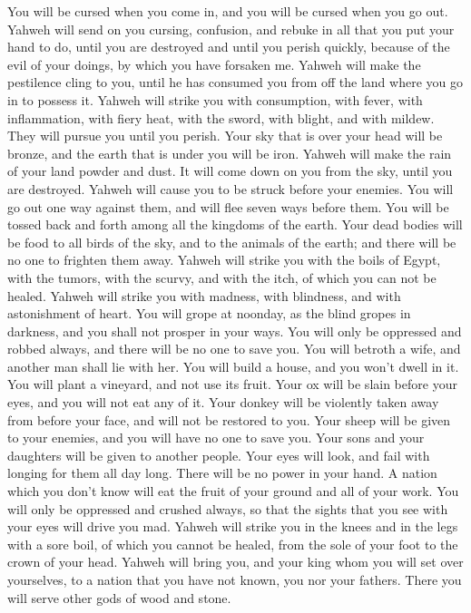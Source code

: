 {You will be cursed when you come in, and you will be cursed when you go out.
Yahweh will send on you cursing, confusion, and rebuke in all that you put your hand to do, until you are destroyed and until you perish quickly, because of the evil of your doings, by which you have forsaken me.
Yahweh will make the pestilence cling to you, until he has consumed you from off the land where you go in to possess it.
Yahweh will strike you with consumption, with fever, with inflammation, with fiery heat, with the sword, with blight, and with mildew. They will pursue you until you perish.
Your sky that is over your head will be bronze, and the earth that is under you will be iron.
Yahweh will make the rain of your land powder and dust. It will come down on you from the sky, until you are destroyed.
Yahweh will cause you to be struck before your enemies. You will go out one way against them, and will flee seven ways before them. You will be tossed back and forth among all the kingdoms of the earth.
Your dead bodies will be food to all birds of the sky, and to the animals of the earth; and there will be no one to frighten them away.
Yahweh will strike you with the boils of Egypt, with the tumors, with the scurvy, and with the itch, of which you can not be healed.
Yahweh will strike you with madness, with blindness, and with astonishment of heart.
You will grope at noonday, as the blind gropes in darkness, and you shall not prosper in your ways. You will only be oppressed and robbed always, and there will be no one to save you.
You will betroth a wife, and another man shall lie with her. You will build a house, and you won’t dwell in it. You will plant a vineyard, and not use its fruit.
Your ox will be slain before your eyes, and you will not eat any of it. Your donkey will be violently taken away from before your face, and will not be restored to you. Your sheep will be given to your enemies, and you will have no one to save you.
Your sons and your daughters will be given to another people. Your eyes will look, and fail with longing for them all day long. There will be no power in your hand.
A nation which you don’t know will eat the fruit of your ground and all of your work. You will only be oppressed and crushed always,
so that the sights that you see with your eyes will drive you mad.
Yahweh will strike you in the knees and in the legs with a sore boil, of which you cannot be healed, from the sole of your foot to the crown of your head.
Yahweh will bring you, and your king whom you will set over yourselves, to a nation that you have not known, you nor your fathers. There you will serve other gods of wood and stone.
}
